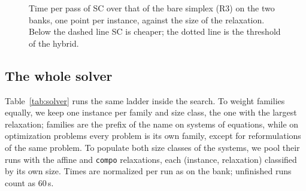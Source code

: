 \documentclass[11pt]{article}
\theoremstyle{definition}
\theoremstyle{remark}
\begin{document}
\begin{figure}[t]
\centering
{}
\caption{Time per pass of SC over that of the bare simplex (R3) on the two
banks, one point per instance, against the size of the relaxation. Below the
dashed line SC is cheaper; the dotted line is the threshold of the hybrid.}
\label{fig:frontier}
\end{figure}

\subsection{The whole solver}\label{sec:main}

Table~\ref{tab:solver} runs the same ladder inside the search. To weight
families equally, we keep one instance per family and size class, the one
with the largest relaxation; families are the prefix of the name on systems
of equations, while on optimization problems every problem is its own family,
except for reformulations of the same problem.
To populate both size classes of the systems, we pool their runs with the
affine and \texttt{compo} relaxations, each (instance, relaxation) classified
by its own size. Times are normalized per run as on the bank; unfinished runs
count as 60\,s.
\end{document}
